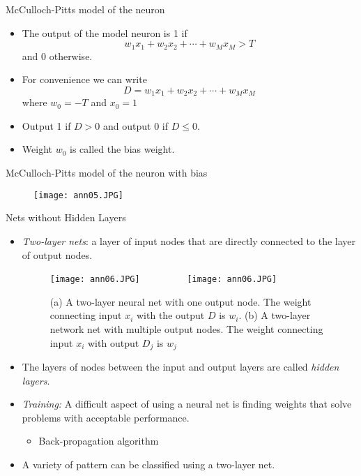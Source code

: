 \begin{frame}{McCulloch-Pitts model of the neuron}
\begin{itemize}
\item The output of the model neuron is 1 if
\begin{equation}
w_1x_1+w_2x_2+\cdots+w_Mx_M>T\nonumber
\end{equation}
and 0 otherwise.
\item For convenience we can write
\begin{equation}
D=w_1x_1+w_2x_2+\cdots+w_Mx_M\nonumber
\end{equation}
where $w_0=-T$ and $x_0=1$
\item Output 1 if $D>0$ and output 0 if $D\leq 0$.
\item Weight $w_0$ is called the bias weight.
\end{itemize}
\end{frame}

\begin{frame}{McCulloch-Pitts model of the neuron with bias}
\begin{figure}
\texttt{[image: ann05.JPG]}
\end{figure}
\end{frame}


\begin{frame}{Nets without Hidden Layers}
\begin{itemize}
\item \textit{\color{slidecolor}Two-layer nets}: a layer of input nodes that are directly connected to the layer of output nodes.
\begin{figure}
\texttt{[image: ann06.JPG]}~~~~~~~~~
\texttt{[image: ann06.JPG]}
\caption{(a) A two-layer neural net with one output node. The weight connecting input $x_i$ with the output $D$ is $w_i$. (b) A two-layer network net with multiple output nodes. The weight connecting input $x_i$ with output $D_j$ is $w_j$}
\end{figure}
\item The layers of nodes between the input and output layers are called \textit{\color{slidecolor} hidden layers}.
\end{itemize}
\end{frame}

\begin{frame}{}
\begin{itemize}
\item \textit{\color{slidecolor}Training:} A difficult aspect of using a neural net is finding weights that solve problems with acceptable performance.
\begin{itemize}
\item Back-propagation algorithm
\end{itemize}
\item A variety of pattern can be classified using a two-layer net.
\end{itemize}
\end{frame}

